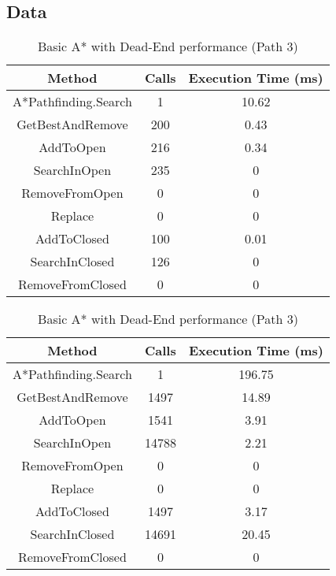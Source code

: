 \documentclass{article}
\begin{document}
  \subsection{Data}
  \begin{table}[h!]
    \parbox{.45\linewidth}{
      \centering
      \caption{NodeArray A* with Goal Bounding performance (Path 2)}
      \label{tab:tableDeadEnd2}
      \begin{tabular}{c|c|c}
        \textbf{Method} & \textbf{Calls} & \textbf{Execution Time (ms)}\\
        \hline
        A*Pathfinding.Search  & 1 & 10.62\\
        GetBestAndRemove & 200 & 0.43\\
        AddToOpen & 216 & 0.34\\
        SearchInOpen & 235 & 0\\
        RemoveFromOpen & 0 & 0\\
        Replace & 0 & 0\\
        AddToClosed & 100  & 0.01\\
        SearchInClosed & 126 & 0\\
        RemoveFromClosed & 0 & 0\\
      \end{tabular}
    }
    \hfil
    \parbox{.45\linewidth}{
      \centering
      \caption{Basic A* with Dead-End performance (Path 3)}
      \label{tab:tableDeadEnd3}
      \begin{tabular}{c|c|c}
        \textbf{Method} & \textbf{Calls} & \textbf{Execution Time (ms)}\\
        \hline
        A*Pathfinding.Search  & 1 & 196.75\\
        GetBestAndRemove & 1497 & 14.89\\
        AddToOpen & 1541 & 3.91\\
        SearchInOpen & 14788 & 2.21\\
        RemoveFromOpen & 0 & 0\\
        Replace & 0 & 0\\
        AddToClosed & 1497 & 3.17\\
        SearchInClosed & 14691 & 20.45\\
        RemoveFromClosed & 0 & 0\\
      \end{tabular}
    }
  \end{table}
\end{document}
